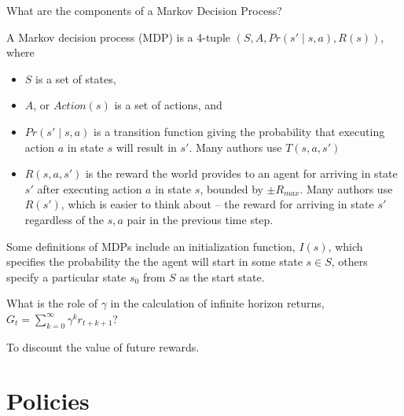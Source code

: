 \begin{questions}

\question What are the components of a Markov Decision Process?

\begin{solution}[3in]
A Markov decision process (MDP) is a 4-tuple $\left( S, A, Pr(s' \mid s, a), R(s) \right)$, where

\begin{itemize}
\item $S$ is a set of states,
\item $A$, or $Action(s)$ is a set of actions, and
\item $Pr(s' \mid s, a)$ is a transition function giving the probability that executing action $a$ in state $s$ will result in $s'$.  Many authors use $T(s, a, s')$
\item  $R(s, a, s')$ is the reward the world provides to an agent for arriving in state $s'$ after executing action $a$ in state $s$, bounded by $\pm R_{max}$.  Many authors use $R(s')$, which is easier to think about -- the reward for arriving in state $s'$ regardless of the $s, a$ pair in the previous time step.
\end{itemize}

Some definitions of MDPs include an initialization function, $I(s)$, which specifies the probability the the agent will start in some state $s \in S$, others specify a particular state $s_0$ from $S$ as the start state.
\end{solution}



\question  What is the role of $\gamma$ in the calculation of infinite horizon returns, $G_t = \sum_{k = 0}^\infty \gamma^k r_{t+k+1}$?

\begin{solution}[.5in]
To discount the value of future rewards.
\end{solution}

\end{questions}

\newpage

\section{Policies}


